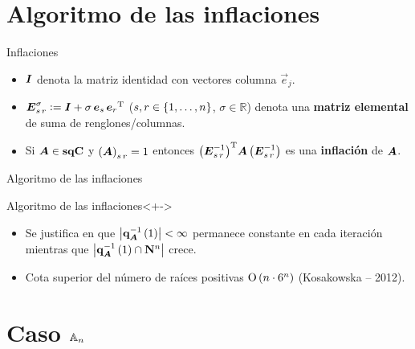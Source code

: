 \documentclass[spanish]{beamer}
\begin{document}
\section{Algoritmo de las inflaciones}
\begin{frame}{Inflaciones}
  \begin{definitions}
    \begin{itemize}[<+->]
      \item $\boldsymbol{I}$ denota la matriz identidad con vectores columna 
      $\vec{e}_j$.
      \item $\boldsymbol{E}_{{s} \, {r}}^{\sigma} \mathrel{\mathop:}= \boldsymbol{I} + \sigma \, \boldsymbol{e}_s \, 
      {\boldsymbol{e}_r}^{\operatorname{T}}$ ($s, r \in \left\{{1, \ldots, n}\right\}$, $\sigma \in 
      \mathbb{R}$) denota una \textbf{matriz elemental} de suma de renglones/columnas.
      \item Si $\boldsymbol{A} \in \mathbf{sqC}$ y $\left({\boldsymbol{A}}\right)_{{s}\,{r}} = 1$ entonces 
      ${\left(\boldsymbol{E}_{{s} \, {r}}^{-1}\right)}^{\operatorname{T}} \boldsymbol{A} 
      \left(\boldsymbol{E}_{{s} \, {r}}^{-1}\right)$ es una \textbf{inflación} de $\boldsymbol{A}$.
    \end{itemize}
  \end{definitions}
\end{frame}

\begin{frame}{Algoritmo de las inflaciones}
  \begin{block}{Algoritmo de las inflaciones}<+->
    \begin{algorithm}[H]
    \end{algorithm}
  \end{block}
  \begin{itemize}[<+->]
    \item Se justifica en que $\left|{\mathbf{q}_{\boldsymbol{A}}^{-1}\left(1\right)}\right| < 
    \infty$ permanece constante en cada iteración mientras que 
    $\left|{\mathbf{q}_{\boldsymbol{A}}^{-1}\left(1\right)\cap\mathbf{N}^n}\right|$ crece.
    \item Cota superior del número de raíces positivas $\operatorname{O}\left( n \cdot 6^{n} \right)$ (Kosakowska -- 2012).
  \end{itemize}
\end{frame}
	
\section{Caso $\mathbb{A}_{n}$}
\end{document}
